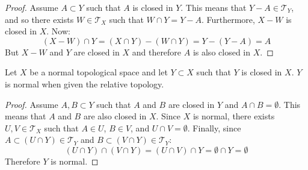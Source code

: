 \documentclass[letterpaper,12pt,fleqn]{article}
\newcommand{\T}{\mathscr{T}}
\begin{document}
\begin{proof}
  Assume \(A\subset Y\) such that \(A\) is closed in \(Y\).  This means that \(Y-A\in\T_Y\), and so there exists
  \(W\in\T_X\) such that \(W\cap Y=Y-A\).  Furthermore, \(X-W\) is closed in \(X\).  Now:
  \[(X-W)\cap Y=(X\cap Y)-(W\cap Y)=Y-(Y-A)=A\]
  But \(X-W\) and \(Y\) are closed in \(X\) and therefore \(A\) is also closed in \(X\).
\end{proof}

\begin{theorem}
  Let \(X\) be a normal topological space and let \(Y\subset X\) such that \(Y\) is closed in \(X\).  \(Y\) is
  normal when given the relative topology.
\end{theorem}

\begin{proof}
  Assume \(A,B\subset Y\) such that \(A\) and \(B\) are closed in \(Y\) and \(A\cap B=\emptyset\).  This means that
  \(A\) and \(B\) are also closed in \(X\).  Since \(X\) is normal, there exists \(U,V\in\T_X\) such that \(A\in U\),
  \(B\in V\), and \(U\cap V=\emptyset\).  Finally, since \(A\subset(U\cap Y)\in\T_Y\) and \(B\subset(V\cap Y)\in\T_Y\):
  \[(U\cap Y)\cap(V\cap Y)=(U\cap V)\cap Y=\emptyset\cap Y=\emptyset\]
  Therefore \(Y\) is normal.
\end{proof}
\end{document}
